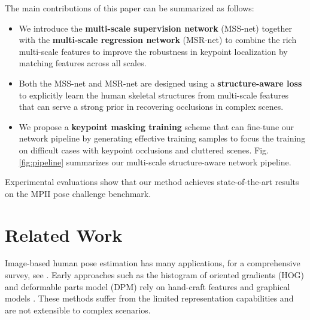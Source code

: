 \documentclass[runningheads]{llncs}
\begin{document}
The main contributions of this paper can be summarized as follows:
\begin{itemize} \itemsep 0em
\item We introduce the {\bf multi-scale supervision network} (MSS-net) together with the {\bf multi-scale regression network} (MSR-net) to combine the rich multi-scale features to improve the robustness in keypoint localization by matching features across all scales.
\item Both the MSS-net and MSR-net are designed using a {\bf structure-aware loss} to explicitly learn the human skeletal structures from multi-scale features that can serve a strong prior in recovering occlusions in complex scenes.
\item We propose a {\bf keypoint masking training} scheme that can fine-tune our network pipeline by generating effective training samples to focus the training on difficult cases with keypoint occlusions and cluttered scenes. Fig. \ref{fig:pipeline} summarizes our multi-scale structure-aware network pipeline.
\end{itemize}
Experimental evaluations show that our method achieves state-of-the-art results on the MPII pose challenge benchmark.

























\section{Related Work}

Image-based human pose estimation has many applications, for a comprehensive survey, see \cite{liu2015a}. Early approaches such as the histogram of oriented gradients (HOG) and deformable parts model (DPM) rely on hand-craft features and graphical models \cite{Bourdev:Malik:Poselet:ICCV2009,Lafferty01conditionalrandom,Charles:BBC:Pose:BMVC2013,Cherian:MixingBodyPart:CVPR2014,Sapp:Taskar:MODEC:CVPR2013,chang_bmvc15}. These methods suffer from the limited representation capabilities and are not extensible to complex scenarios.
\end{document}

